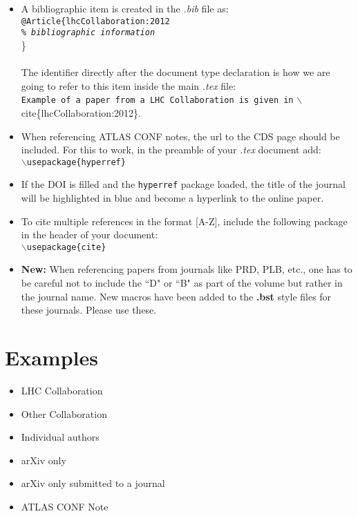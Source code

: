 \documentclass{../../style/atlasdoc}
\begin{document}
\begin{itemize}
	\item A bibliographic item is created in the \emph{.bib} file as: \\
		\texttt{@Article\{lhcCollaboration:2012 \\ \emph{\% bibliographic information}} \\ \} \\
		\\
		The identifier directly after the document type declaration is how we are going to refer to this item inside the main \emph{.tex} file: \\
		{\small{\texttt{Example of a paper from a LHC Collaboration is given in} $\backslash$cite\{lhcCollaboration:2012\}.}}
	\item When referencing ATLAS CONF notes, the url to the CDS page should be included. For this to work, in the preamble of your \emph{.tex} document add: \\
		\texttt{$\backslash$usepackage\{hyperref\}}
	\item If the DOI is filled and the \texttt{hyperref} package loaded, the title of the journal will be highlighted in blue and become a hyperlink to the online paper.
	\item To cite multiple references in the format [A-Z], include the following package in the header of your document: \\
	         \texttt{$\backslash$usepackage\{cite\}}	
	\item \textbf{\color{red} New:} When referencing papers from journals like PRD, PLB, etc., one has to be careful not to include the ``D" or ``B" as part of the volume but rather in the journal name. New macros have been added to the \textbf{.bst} style files for these journals. Please use these.
\end{itemize}


\section{Examples}

\begin{itemize}
	\item LHC Collaboration~\cite{lhcCollaboration:2012}
	\item Other Collaboration~\cite{otherCollaboration:2007}
	\item Individual authors~\cite{authors:2008}
	\item arXiv only~\cite{arxivOnly:2009}
	\item arXiv only submitted to a journal~\cite{arxivSub:2011}
	\item ATLAS CONF Note~\cite{atlasConf:2012} 
\end{itemize}
\end{document}
